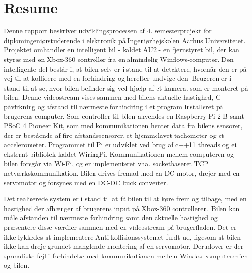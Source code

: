 \chapter{Resume}
\label{ch:Resume}

Denne rapport beskriver udviklingsprocessen af 4. semesterprojekt for diplomingeniørstuderende i elektronik på Ingeniørhøjskolen Aarhus Universitetet. 
Projektet omhandler en intelligent bil - kaldet AU2 - en fjernstyret bil, der kan styres med en Xbox-360 controller\cite{lib:xbox-360} fra en almindelig Windows-computer. 
Den intelligente del består i, at bilen selv er i stand til at detektere, hvornår den er på vej til at kollidere med en forhindring og herefter undvige den. 
Brugeren er i stand til at se, hvor bilen befinder sig ved hjælp af et kamera\cite{lib:cam}, som er monteret på bilen. 
Denne videostream vises sammen med bilens aktuelle hastighed, G-påvirkning og  afstand til nærmeste forhindring i et program installeret på brugerens computer.
Som controller til bilen anvendes en Raspberry Pi 2 B samt PSoC 4 Pioneer Kit\cite{lib:psoc4_guide}, som med \IIC kommunikationen henter data fra bilens sensorer, der er bestående af fire afstandssensorer\cite{lib:maxsonar}, et hjemmelavet tachometer og et accelerometer\cite{lib:accel}. 
Programmet til Pi er udviklet ved brug af c++11 threads og et eksternt \IIC bibliotek kaldet WiringPi\cite{lib:wiringpi}. 
Kommunikationen mellem computeren og bilen foregår via Wi-Fi, og er implementeret vha. socketbaseret TCP netværkskommunikation. 
Bilen drives fremad med en DC-motor, drejer med en servomotor og forsynes med en DC-DC buck converter.

Det realiserede system er i stand til at få bilen til at køre frem og tilbage, med en hastighed der afhænger af brugerens input på Xbox-360 controlleren. Bilen kan måle afstanden til nærmeste forhindring samt den aktuelle hastighed og præsentere disse værdier sammen med en videostream på brugerfladen. Det er ikke lykkedes at implementere Anti-kollisionssystemet fuldt ud, ligesom at bilen ikke kan dreje grundet manglende montering af en servomotor. Derudover er der sporadiske fejl i forbindelse med kommunikationen mellem Windos-computeren'en og bilen.
\clearpage


